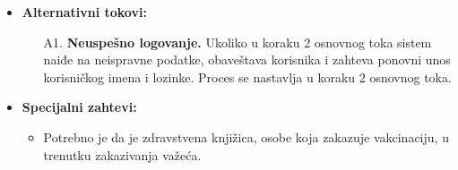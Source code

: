 \documentclass[titlepage]{article}
\begin{document}
\begin{itemize}
    
    \item \textbf{Alternativni tokovi:}
        \begin{itemize}
            \item[A1.] \textbf{Neuspešno logovanje.} Ukoliko u koraku 2 osnovnog toka sistem naiđe na neispravne podatke, obaveštava korisnika i zahteva ponovni unos korisničkog imena i lozinke. Proces se nastavlja u koraku 2 osnovnog toka.
        \end{itemize}
    
    \item \textbf{Specijalni zahtevi:}
		\begin{itemize}
			\item Potrebno je da je zdravstvena knjižica, osobe koja zakazuje vakcinaciju, u trenutku zakazivanja važeća.
		\end{itemize}
  
\end{itemize}
\end{document}
